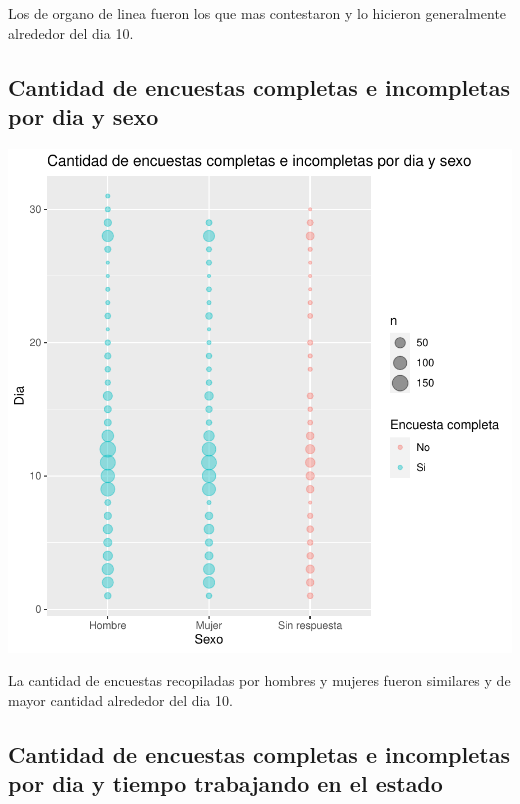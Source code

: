 \documentclass{article}
\begin{document}
Los de organo de linea fueron los que mas contestaron y lo hicieron generalmente alrededor del dia 10.

\subsection{Cantidad de encuestas completas e incompletas por dia y sexo}

\includegraphics{seguimientov3-017}

La cantidad de encuestas recopiladas por hombres y mujeres fueron similares y de mayor cantidad alrededor del dia 10.

\subsection{Cantidad de encuestas completas e incompletas por dia y tiempo trabajando en el estado}
\end{document}
